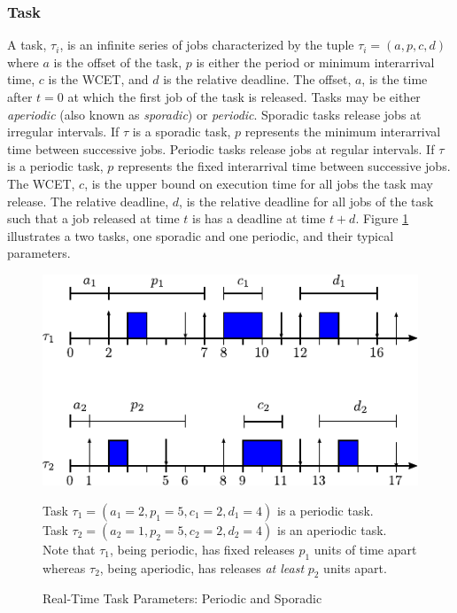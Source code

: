 \subsubsection{Task}

A task, $\tau_i$, is an infinite series of jobs characterized by the tuple $\tau_i = (a,p,c,d)$ where $a$ is the offset of the task,
$p$ is either the period or minimum interarrival time,
$c$ is the WCET,
and $d$ is the relative deadline.
The offset, $a$, is the time after $t=0$ at which the first job of the task is released.
Tasks may be either \textit{aperiodic} (also known as \textit{sporadic}) or \textit{periodic}.
Sporadic tasks release jobs at irregular intervals.
If $\tau$ is a sporadic task, $p$ represents the minimum interarrival time between successive jobs.
Periodic tasks release jobs at regular intervals.
If $\tau$ is a periodic task, $p$ represents the fixed interarrival time between successive jobs.
The WCET, $c$, is the upper bound on execution time for all jobs the task may release.
The relative deadline, $d$, is the relative deadline for all jobs of the task such that a job released at time $t$ is has a deadline at time $t+d$.
Figure \ref{fig:rt-task} illustrates a two tasks, one sporadic and one periodic, and their typical parameters.

\begin{figure}[!htbp]
    \centering
    \includegraphics[width=0.75\linewidth]{fig/taskParameters.pdf}
    \caption{Real-Time Task Parameters: Periodic and Sporadic}
    Task $\tau_1 = (a_1=2, p_1 = 5, c_1=2, d_1=4)$ is a periodic task.\\
    Task $\tau_2 = (a_2=1,p_2=5,c_2=2,d_2=4)$ is an aperiodic task.\\
    Note that $\tau_1$, being periodic, has fixed releases $p_1$ units of time apart whereas $\tau_2$, being aperiodic, has releases \textit{at least} $p_2$ units apart.
    \label{fig:rt-task}
\end{figure}

